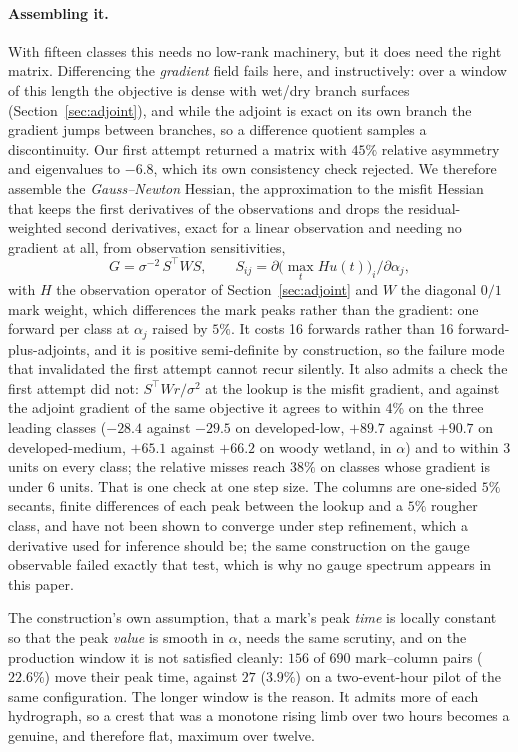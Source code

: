 \documentclass[11pt]{article}
\begin{document}
\paragraph{Assembling it.} With fifteen classes this needs no low-rank
machinery, but it does need the right matrix. Differencing the
\emph{gradient} field fails here, and instructively: over a window of
this length the objective is dense with wet/dry branch surfaces
(Section~\ref{sec:adjoint}), and while the adjoint is exact on its own
branch the gradient jumps between branches, so a difference quotient
samples a discontinuity. Our first attempt returned a matrix with
$45\%$ relative asymmetry and eigenvalues to $-6.8$, which its own
consistency check rejected. We therefore assemble the
\emph{Gauss--Newton} Hessian, the approximation to the misfit Hessian
that keeps the first derivatives of the observations and drops the
residual-weighted second derivatives, exact for a linear observation
and needing no gradient at all, from observation sensitivities,
\begin{equation}
G = \sigma^{-2}\, S^\top W S, \qquad
S_{ij} = \partial\big(\max_t H u(t)\big)_i / \partial \alpha_j ,
\label{eq:gn}
\end{equation}
with $H$ the observation operator of Section~\ref{sec:adjoint} and
$W$ the diagonal $0/1$ mark weight, which differences the mark peaks
rather than the gradient: one forward per class at $\alpha_j$ raised
by $5\%$. It costs 16 forwards rather than 16 forward-plus-adjoints,
and it is positive semi-definite by construction, so the failure mode
that invalidated the first attempt cannot recur silently. It also
admits a check the first attempt did not: $S^\top W r/\sigma^2$ at
the lookup is the misfit gradient, and against the adjoint gradient
of the same objective it agrees to within $4\%$ on the three leading
classes ($-28.4$ against $-29.5$ on developed-low, $+89.7$ against
$+90.7$ on developed-medium, $+65.1$ against $+66.2$ on woody wetland,
in $\alpha$) and to within $3$ units on every class; the relative
misses reach $38\%$ on classes whose gradient is under $6$ units. That
is one check at one step size. The columns are
one-sided $5\%$ secants, finite differences of each peak between the
lookup and a $5\%$ rougher class, and have not been shown to converge
under
step refinement, which a derivative used for inference should be;
the same construction on the gauge observable failed exactly that
test, which is why no gauge spectrum appears in this paper.

The construction's own assumption, that a mark's peak \emph{time} is
locally constant so that the peak \emph{value} is smooth in $\alpha$,
needs the same scrutiny, and on the production window it is not
satisfied cleanly: $156$ of $690$ mark--column pairs ($22.6\%$) move
their peak time, against $27$ ($3.9\%$) on a two-event-hour pilot of
the same configuration. The longer window is the reason. It admits
more of each hydrograph, so a crest that was a monotone rising limb
over two hours becomes a genuine, and therefore flat, maximum over
twelve.
\end{document}
